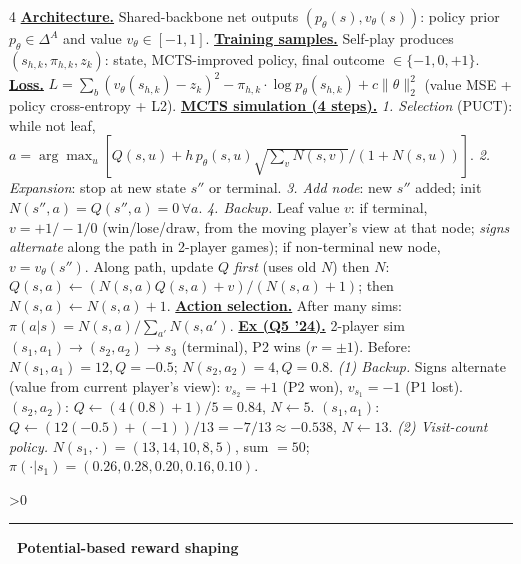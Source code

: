 \documentclass[10pt,landscape,letterpaper]{article}
\let\oldtextbf\textbf
\renewcommand{\textbf}[1]{\uline{\oldtextbf{#1}}}
\renewcommand{\section}[1]{%
  \ifnum\value{section}>0\par\vspace{1pt}\hrule\vspace{1pt}\fi
  \refstepcounter{section}\oldtextbf{\thesection\ #1}\ }
\begin{document}
\begin{multicols*}{4}
\textbf{Architecture.} Shared-backbone net outputs \((p_\theta(s),v_\theta(s))\): policy prior \(p_\theta\in\Delta^A\) and value \(v_\theta\in[-1,1]\).
\textbf{Training samples.} Self-play produces \((s_{h,k},\pi_{h,k},z_k)\): state, MCTS-improved policy, final outcome \(\in\{-1,0,+1\}\).
\textbf{Loss.} \(L=\sum_b(v_\theta(s_{h,k}){-}z_k)^2-\pi_{h,k}\cdot\log p_\theta(s_{h,k})+c\|\theta\|_2^2\) (value MSE + policy cross-entropy + L2).
\textbf{MCTS simulation (4 steps).}
\emph{1. Selection} (PUCT): while not leaf, \(a{=}\arg\max_u[Q(s,u)+h\,p_\theta(s,u)\sqrt{\!\sum_v\!N(s,v)}/(1{+}N(s,u))]\).
\emph{2. Expansion}: stop at new state \(s''\) or terminal.
\emph{3. Add node}: new \(s''\) added; init \(N(s'',a){=}Q(s'',a){=}0\,\forall a\).
\emph{4. Backup.} Leaf value \(v\): if terminal, \(v{=}{+}1/{-}1/0\) (win/lose/draw, from the moving player's view at that node; \emph{signs alternate} along the path in 2-player games); if non-terminal new node, \(v{=}v_\theta(s'')\). Along path, update \(Q\) \emph{first} (uses old \(N\)) then \(N\):
\(Q(s,a){\leftarrow}(N(s,a)Q(s,a){+}v)/(N(s,a){+}1)\); then \(N(s,a){\leftarrow}N(s,a){+}1\).
\textbf{Action selection.} After many sims: \(\pi(a|s)=N(s,a)/\sum_{a'}N(s,a')\).
\textbf{Ex (Q5 '24).} 2-player sim \((s_1,a_1){\to}(s_2,a_2){\to}s_3\) (terminal), P2 wins (\(r{=}\pm 1\)). Before: \(N(s_1,a_1){=}12,Q{=}{-}0.5\); \(N(s_2,a_2){=}4,Q{=}0.8\).
\emph{(1) Backup.} Signs alternate (value from current player's view): \(v_{s_2}{=}{+}1\) (P2 won), \(v_{s_1}{=}{-}1\) (P1 lost).
\((s_2,a_2)\): \(Q{\leftarrow}(4(0.8){+}1)/5{=}0.84\), \(N{\leftarrow}5\).
\((s_1,a_1)\): \(Q{\leftarrow}(12({-}0.5){+}({-}1))/13{=}{-}7/13{\approx}{-}0.538\), \(N{\leftarrow}13\).
\emph{(2) Visit-count policy.} \(N(s_1,\cdot){=}(13,14,10,8,5)\), sum \({=}50\); \(\pi(\cdot|s_1){=}(0.26,0.28,0.20,0.16,0.10)\).

\section{Potential-based reward shaping}


\end{multicols*}
\end{document}
